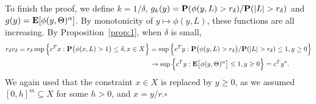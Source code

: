 \documentclass[a4paper, a4wide, 10pt, reqno]{amsart}
\theoremstyle{plain}
\renewcommand{\qed}{\hfill$\square$}
\begin{document}
To finish the proof, we define $k=1/\delta$, $g_k(y)={\bf P}(\phi(y,L) > r_\delta)/{\bf P}(|L| > r_\delta)$ and $g(y)={\bf E}[\phi(y,\Theta)^\alpha]$. By monotonicity of $y\mapsto\phi(y, L)$, these functions are all increasing.  By Proposition~\ref{prop:1}, when $\delta$ is  small,
\begin{align*}
    r_\delta v_\delta = r_\delta \sup\Big\{c^Tx: {\bf P}\big(\phi(x, L)>1\big)\le \delta, x\in X\Big\}
    &=\sup\Big\{c^Ty: {\bf P}\big(\phi(y, L)>r_\delta\big)/{\bf P}(|L|>r_\delta)\le 1, y\ge 0\Big\} \\
    &\to \sup\Big\{c^Ty: {\bf E}\big[\phi(y,\Theta)^\alpha\big]\le 1, y\ge 0\Big\}=c^Ty^\ast.
\end{align*}
We again used that the constraint $x\in X$ is replaced by $y\ge 0$, as we assumed $[0, h]^m \subseteq X$ for some $h>0$, and $x=y/r$.\qed
\end{document}
